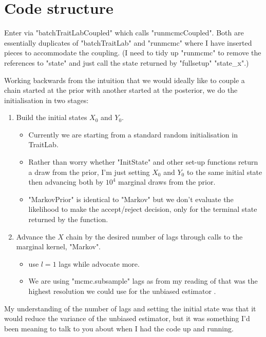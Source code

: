 \documentclass[11pt,a4paper]{article}
\begin{document}
\section{Code structure}

Enter via "batchTraitLabCoupled" which calls "runmcmcCoupled". Both are essentially duplicates of "batchTraitLab" and "runmcmc" where I have inserted pieces to accommodate the coupling. (I need to tidy up "runmcmc" to remove the references to "state" and just call the state returned by "fullsetup" "state_x".)



Working backwards from the intuition that we would ideally like to couple a chain started at the prior with another started at the posterior, we do the initialisation in two stages:
\begin{enumerate}
    \item Build the initial states $ X_0 $ and $ Y_0 $.
    \begin{itemize}
        \item Currently we are starting from a standard random initialisation in TraitLab.
        \item Rather than worry whether "InitState" and other set-up functions return a draw from the prior, I'm just setting $ X_0 $ and $ Y_0 $ to the same initial state then advancing both by $ 10^4 $ marginal draws from the prior.
        \item "MarkovPrior" is identical to "Markov" but we don't evaluate the likelihood to make the accept/reject decision, only for the terminal state returned by the function.
    \end{itemize}
    \item Advance the $ X $ chain by the desired number of lags through calls to the marginal kernel, "Markov".
    \begin{itemize}
        \item \citet{jacob20} use $ l = 1 $ lags while \citet{biswas19} advocate more.
        \item We are using "mcmc.subsample" lags as from my reading of \citet{biswas19} that was the highest resolution we could use for the unbiased estimator \citep[Appendix~A.1]{biswas19}.
    \end{itemize}
\end{enumerate}
My understanding of the number of lags and setting the initial state was that it would reduce the variance of the unbiased estimator, but it was something I'd been meaning to talk to you about when I had the code up and running.
\end{document}
